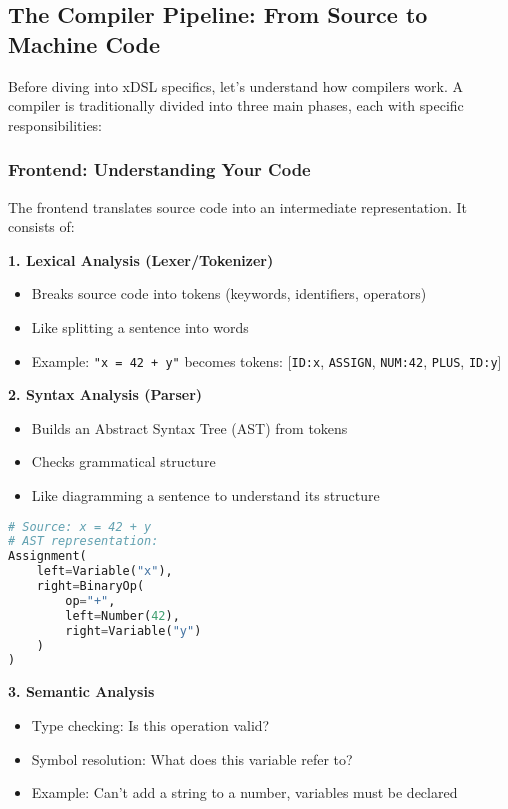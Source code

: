 \documentclass[11pt,a4paper]{article}
\begin{document}
\subsection{The Compiler Pipeline: From Source to Machine Code}

Before diving into xDSL specifics, let's understand how compilers work. A compiler is traditionally divided into three main phases, each with specific responsibilities:

\subsubsection{Frontend: Understanding Your Code}

The frontend translates source code into an intermediate representation. It consists of:

\textbf{1. Lexical Analysis (Lexer/Tokenizer)}
\begin{itemize}
    \item Breaks source code into tokens (keywords, identifiers, operators)
    \item Like splitting a sentence into words
    \item Example: \texttt{"x = 42 + y"} becomes tokens: [\texttt{ID:x}, \texttt{ASSIGN}, \texttt{NUM:42}, \texttt{PLUS}, \texttt{ID:y}]
\end{itemize}

\textbf{2. Syntax Analysis (Parser)}
\begin{itemize}
    \item Builds an Abstract Syntax Tree (AST) from tokens
    \item Checks grammatical structure
    \item Like diagramming a sentence to understand its structure
\end{itemize}

\begin{lstlisting}[language=Python, caption=Simple AST Example]
# Source: x = 42 + y
# AST representation:
Assignment(
    left=Variable("x"),
    right=BinaryOp(
        op="+",
        left=Number(42),
        right=Variable("y")
    )
)
\end{lstlisting}

\textbf{3. Semantic Analysis}
\begin{itemize}
    \item Type checking: Is this operation valid?
    \item Symbol resolution: What does this variable refer to?
    \item Example: Can't add a string to a number, variables must be declared
\end{itemize}
\end{document}
